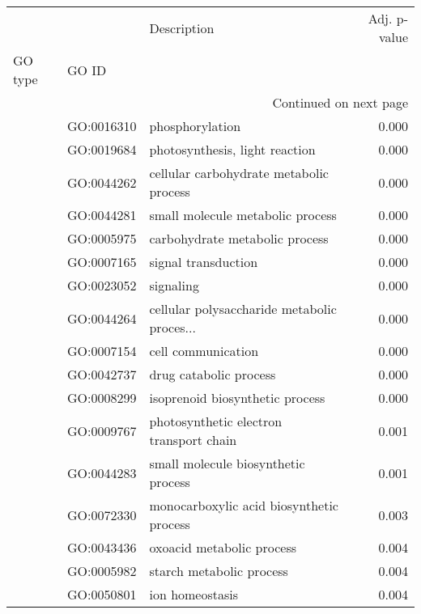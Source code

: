 \begin{longtable}{lllr}
\toprule
   &            &                                  Description &  Adj. p-value \\
GO type & GO ID &                                              &               \\
\midrule
\endhead
\midrule
\multicolumn{4}{r}{{Continued on next page}} \\
\midrule
\endfoot

\bottomrule
\endlastfoot
\multirow{172}{*}{BP} & GO:0016310 &                              phosphorylation &         0.000 \\
   & GO:0019684 &               photosynthesis, light reaction &         0.000 \\
   & GO:0044262 &      cellular carbohydrate metabolic process &         0.000 \\
   & GO:0044281 &             small molecule metabolic process &         0.000 \\
   & GO:0005975 &               carbohydrate metabolic process &         0.000 \\
   & GO:0007165 &                          signal transduction &         0.000 \\
   & GO:0023052 &                                    signaling &         0.000 \\
   & GO:0044264 &  cellular polysaccharide metabolic proces... &         0.000 \\
   & GO:0007154 &                           cell communication &         0.000 \\
   & GO:0042737 &                       drug catabolic process &         0.000 \\
   & GO:0008299 &              isoprenoid biosynthetic process &         0.000 \\
   & GO:0009767 &      photosynthetic electron transport chain &         0.001 \\
   & GO:0044283 &          small molecule biosynthetic process &         0.001 \\
   & GO:0072330 &     monocarboxylic acid biosynthetic process &         0.003 \\
   & GO:0043436 &                    oxoacid metabolic process &         0.004 \\
   & GO:0005982 &                     starch metabolic process &         0.004 \\
   & GO:0050801 &                              ion homeostasis &         0.004 \\

\end{longtable}
